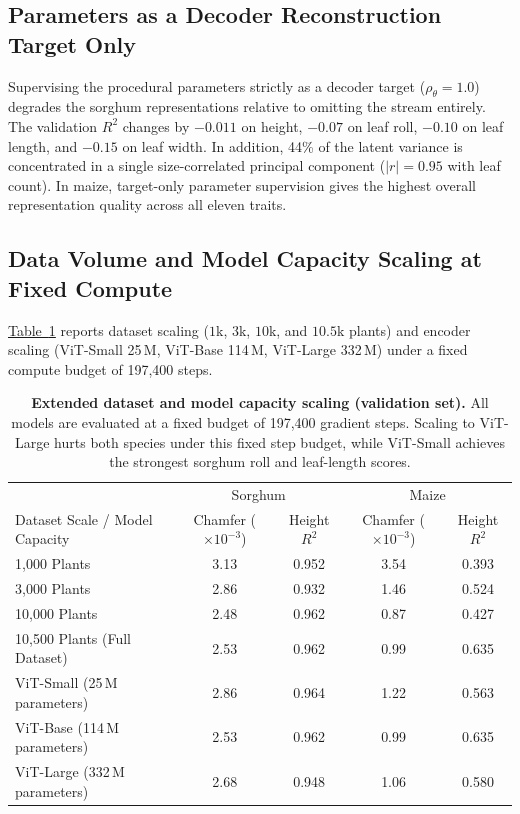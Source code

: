 \documentclass[10pt,twocolumn,letterpaper]{article}
\newcommand{\tabref}[1]{\hyperref[#1]{Table~\ref*{#1}}}
\begin{document}
\subsection{Parameters as a Decoder Reconstruction Target Only}
Supervising the procedural parameters strictly as a decoder target ($\rho_\theta = 1.0$) degrades the sorghum representations relative to omitting the stream entirely. The validation $R^2$ changes by $-0.011$ on height, $-0.07$ on leaf roll, $-0.10$ on leaf length, and $-0.15$ on leaf width. In addition, 44\% of the latent variance is concentrated in a single size-correlated principal component ($|r| = 0.95$ with leaf count). In maize, target-only parameter supervision gives the highest overall representation quality across all eleven traits.

\subsection{Data Volume and Model Capacity Scaling at Fixed Compute}
\tabref{tab:supp-scaling} reports dataset scaling ($1$k, $3$k, $10$k, and $10.5$k plants) and encoder scaling (ViT-Small 25\,M, ViT-Base 114\,M, ViT-Large 332\,M) under a fixed compute budget of 197{,}400 steps.

\begin{table}[t]
  \caption{\textbf{Extended dataset and model capacity scaling (validation set).} All models are evaluated at a fixed budget of 197{,}400 gradient steps. Scaling to ViT-Large hurts both species under this fixed step budget, while ViT-Small achieves the strongest sorghum roll and leaf-length scores.}
  \label{tab:supp-scaling}
  \centering\small
  \begin{tabular}{lcccc}
  \toprule
   & \multicolumn{2}{c}{Sorghum} & \multicolumn{2}{c}{Maize} \\
  Dataset Scale / Model Capacity & Chamfer ($\times10^{-3}$) & Height $R^2$ & Chamfer ($\times10^{-3}$) & Height $R^2$ \\
  \midrule
  1{,}000 Plants & 3.13 & 0.952 & 3.54 & 0.393 \\
  3{,}000 Plants & 2.86 & 0.932 & 1.46 & 0.524 \\
  10{,}000 Plants & 2.48 & 0.962 & 0.87 & 0.427 \\
  10{,}500 Plants (Full Dataset) & 2.53 & 0.962 & 0.99 & 0.635 \\
  \midrule
  ViT-Small (25\,M parameters) & 2.86 & 0.964 & 1.22 & 0.563 \\
  ViT-Base (114\,M parameters) & 2.53 & 0.962 & 0.99 & 0.635 \\
  ViT-Large (332\,M parameters) & 2.68 & 0.948 & 1.06 & 0.580 \\
  \bottomrule
  \end{tabular}
\end{table}
\end{document}
